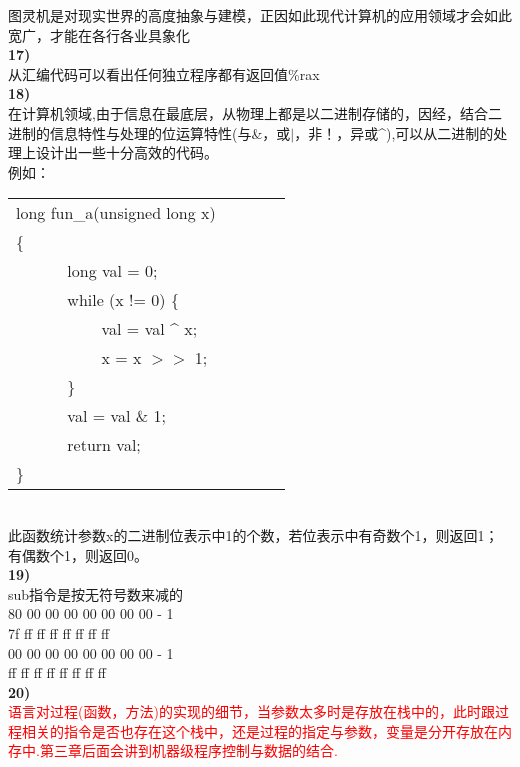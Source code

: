 \documentclass{article}
\newcommand{\red}[1]{\textcolor{red}{#1}}
\begin{document}
\begin{CJK}{UTF8}{uyhei}
图灵机是对现实世界的高度抽象与建模，正因如此现代计算机的应用领域才会如此宽广，才能在各行各业具象化	\\
\textbf{17)}	\\
从汇编代码可以看出任何独立程序都有返回值\%rax	\\
\textbf{18)}	\\
在计算机领域,由于信息在最底层，从物理上都是以二进制存储的，因经，结合二进制的信息特性与处理的位运算特性(与\&，或$|$，非！，异或\^{}),可以从二进制的处理上设计出一些十分高效的代码。	\\
例如：	\\[-2ex]
\begin{table}[ht]
\begin{tabular}{m{2em}m{2em}m{2em}l}
	\multicolumn{3}{l}{long fun\_a(unsigned long x)}	\\
\{	\\
	&	\multicolumn{3}{l}{long val = 0;}	\\
	&	\multicolumn{3}{l}{ while (x != 0) \{ } 	\\
	&	&	\multicolumn{2}{l}{val = val \^{} x;}	\\
	&	&	\multicolumn{2}{l}{x = x $>>$ 1;}	\\
	&	\multicolumn{3}{l}{ \} } 	\\
	&	\multicolumn{3}{l}{val = val \& 1;} 	\\
	&	\multicolumn{3}{l}{return val;} 	\\
\}	\\
\end{tabular}
\end{table}	\\
此函数统计参数x的二进制位表示中1的个数，若位表示中有奇数个1，则返回1；有偶数个1，则返回0。	\\[1ex]
\textbf{19)}	\\
sub指令是按无符号数来减的	\\
80 00 00 00 00 00 00 00 - 1	\\
7f ff ff ff ff ff ff ff		\\[2ex]
00 00 00 00 00 00 00 00 - 1	\\
ff ff ff ff ff ff ff ff		\\[1ex]
\textbf{20)}	\\
\red{ 语言对过程(函数，方法)的实现的细节，当参数太多时是存放在栈中的，此时跟过程相关的指令是否也存在这个栈中，还是过程的指定与参数，变量是分开存放在内存中.第三章后面会讲到机器级程序控制与数据的结合. }

\end{CJK}
\end{document}
